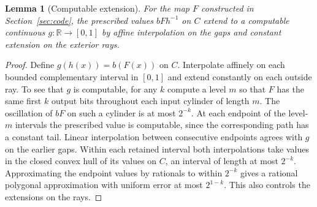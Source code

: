 \documentclass[12pt,reqno]{amsart}
\newtheorem{lemma}[theorem]{Lemma}
\newcommand{\RR}{\mathbb R}
\begin{document}
\begin{lemma}[Computable extension]\label{lem:extend}
For the map $F$ constructed in Section~\ref{sec:code}, the prescribed
values $bFh^{-1}$ on $C$ extend to a computable continuous
$g:\RR\to[0,1]$ by affine interpolation on the gaps and constant
extension on the exterior rays.
\end{lemma}
\begin{proof}

Define $g(h(x))=b(F(x))$ on $C$. Interpolate affinely on each bounded
complementary interval in $[0,1]$ and extend constantly on each outside
ray. To see that $g$ is computable, for any $k$ compute a level $m$ so
that $F$ has the same first $k$ output bits throughout each input
cylinder of length $m$. The oscillation of $bF$ on such a cylinder is
at most $2^{-k}$. At each endpoint of the level-$m$ intervals the
prescribed value is computable, since the corresponding path has a
constant tail. Linear interpolation between consecutive endpoints agrees
with $g$ on the earlier gaps. Within each retained interval both
interpolations take values in the closed convex hull of its values on
$C$, an interval of length at most $2^{-k}$. Approximating the endpoint
values by rationals to within $2^{-k}$ gives a rational polygonal
approximation with uniform error at most $2^{1-k}$. This also controls
the extensions on the rays.

\end{proof}
\end{document}
